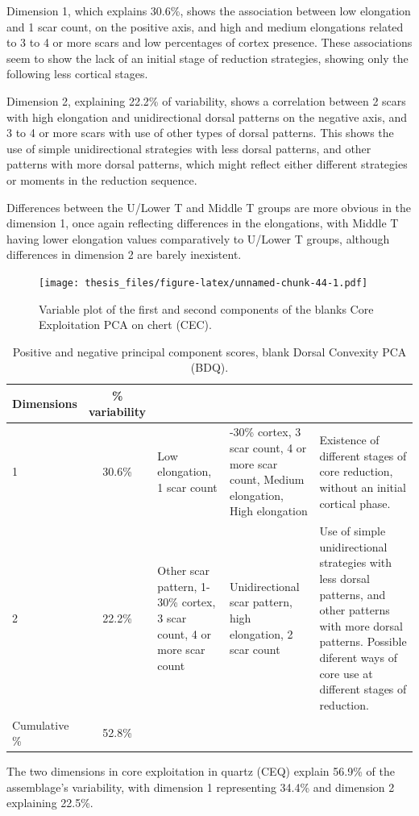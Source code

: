 \documentclass[12pt,twoside]{reedthesis}
\begin{document}
Dimension 1, which explains 30.6\%, shows the association between low elongation and 1 scar count, on the positive axis, and high and medium elongations related to 3 to 4 or more scars and low percentages of cortex presence. These associations seem to show the lack of an initial stage of reduction strategies, showing only the following less cortical stages.

Dimension 2, explaining 22.2\% of variability, shows a correlation between 2 scars with high elongation and unidirectional dorsal patterns on the negative axis, and 3 to 4 or more scars with use of other types of dorsal patterns. This shows the use of simple unidirectional strategies with less dorsal patterns, and other patterns with more dorsal patterns, which might reflect either different strategies or moments in the reduction sequence.

Differences between the U/Lower T and Middle T groups are more obvious in the dimension 1, once again reflecting differences in the elongations, with Middle T having lower elongation values comparatively to U/Lower T groups, although differences in dimension 2 are barely inexistent.
\begin{figure}
\centering
\texttt{[image: thesis\_files/figure-latex/unnamed-chunk-44-1.pdf]}
\caption{\label{fig:unnamed-chunk-44}Variable plot of the first and second components of the blanks Core Exploitation PCA on chert (CEC).}
\end{figure}
\begin{table}

\caption{\label{tab:unnamed-chunk-45}Positive and negative principal component scores, blank Dorsal Convexity PCA (BDQ).}
\centering
\begin{tabular}[t]{lc>{\raggedright\arraybackslash}p{3cm}>{\raggedright\arraybackslash}p{3cm}>{\raggedright\arraybackslash}p{3cm}}
\toprule
\multicolumn{1}{c}{\textbf{Dimensions}} & \multicolumn{1}{c}{\textbf{\% variability}} & \multicolumn{1}{>{\centering\arraybackslash}p{3cm}}{\textbf{+}} & \multicolumn{1}{>{\centering\arraybackslash}p{3cm}}{\textbf{-}} & \multicolumn{1}{>{\centering\arraybackslash}p{3cm}}{\textbf{Interpretation}}\\
\midrule
1 & 30.6\% & Low elongation, 1 scar count & 1-30\% cortex, 3 scar count, 4 or more scar count, Medium elongation, High elongation & Existence of different stages of core reduction, without an initial cortical phase.\\
2 & 22.2\% & Other scar pattern, 1-30\% cortex, 3 scar count, 4 or more scar count & Unidirectional scar pattern, high elongation, 2 scar count & Use of simple unidirectional strategies with less dorsal patterns, and other patterns with more dorsal patterns. Possible diferent ways of core use at different stages of reduction.\\
Cumulative \% & 52.8\% &  &  & \\
\bottomrule
\end{tabular}
\end{table}
The two dimensions in core exploitation in quartz (CEQ) explain 56.9\% of the assemblage's variability, with dimension 1 representing 34.4\% and dimension 2 explaining 22.5\%.
\end{document}
